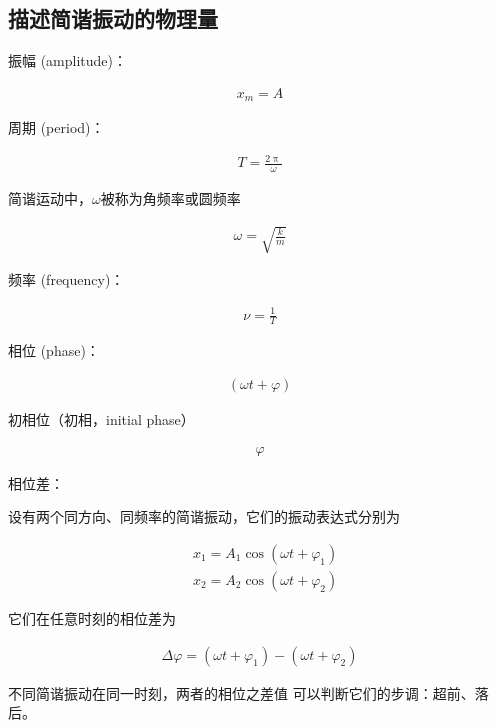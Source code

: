 \documentclass[12pt, a4paper]{article}
\numberwithin{equation}{section}
\begin{document}
\subsection{描述简谐振动的物理量}

    振幅 (amplitude)：

    \begin{align}
        x_m = A
    \end{align}

    周期 (period)：

    \begin{align}
        T = \frac{2 \uppi}{\omega}
    \end{align}

    简谐运动中，\(\omega\)被称为角频率或圆频率

    \begin{align}
        \omega = \sqrt{\frac{k}{m}}
    \end{align}

    频率 (frequency)：

    \begin{align}
        \nu = \frac{1}{T}
    \end{align}

    相位 (phase)：

    \begin{align}
        \left(\omega t + \varphi\right)
    \end{align}

    初相位（初相，initial phase）

    \begin{align}
        \varphi
    \end{align}

    相位差：

    设有两个同方向、同频率的简谐振动，它们的振动表达式分别为
    
    $$
        \begin{aligned}
            & x_1=A_1 \cos \left(\omega t+\varphi_1\right) \\
            & x_2=A_2 \cos \left(\omega t+\varphi_2\right)
        \end{aligned}
    $$

    它们在任意时刻的相位差为

    \begin{align}
        \Delta \varphi = \left(\omega t+\varphi_1\right) - \left(\omega t+\varphi_2\right)
    \end{align}

    不同简谐振动在同一时刻，两者的相位之差值
    可以判断它们的步调：超前、落后。
\end{document}
